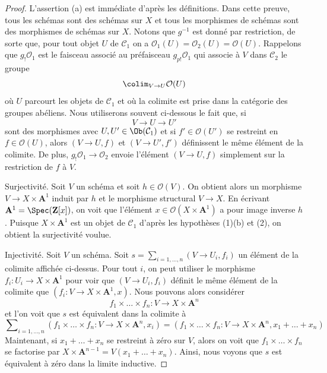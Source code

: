 \begin{proof}
L'assertion (a) est imm\'ediate d'apr\`es les d\'efinitions.
Dans cette preuve, tous les sch\'emas sont des sch\'emas sur $X$ et tous les morphismes de
sch\'emas sont des morphismes de sch\'emas sur $X$. Notons que $g^{-1}$ est
donn\'e par restriction, de sorte que, pour tout objet $U$ de $\mathcal{C}_1$
on a $\mathcal{O}_1(U) = \mathcal{O}_2(U) = \mathcal{O}(U)$.
Rappelons que $g_!\mathcal{O}_1$ est le faisceau associ\'e au pr\'efaisceau
$g_{p!}\mathcal{O}_1$ qui associe \`a $V$ dans $\mathcal{C}_2$ le groupe
$$
\colim_{V \to U} \mathcal{O}(U)
$$
o\`u $U$ parcourt les objets de $\mathcal{C}_1$ et o\`u la colimite est
prise dans la cat\'egorie des groupes ab\'eliens. Nous utiliserons souvent ci-dessous
le fait que, si
$$
V \to U \to U'
$$
sont des morphismes avec $U, U' \in \Ob(\mathcal{C}_1)$
et si $f' \in \mathcal{O}(U')$ se restreint en $f \in \mathcal{O}(U)$,
alors $(V \to U, f)$ et $(V \to U', f')$ d\'efinissent le m\^eme \'el\'ement de la
colimite. De plus, $g_!\mathcal{O}_1 \to \mathcal{O}_2$ envoie l'\'el\'ement
$(V \to U, f)$ simplement sur la restriction de $f$ \`a $V$.

\medskip\noindent
Surjectivit\'e. Soit $V$ un sch\'ema et soit $h \in \mathcal{O}(V)$.
On obtient alors un morphisme $V \to X \times \mathbf{A}^1$ induit par $h$
et le morphisme structural $V \to X$. En \'ecrivant
$\mathbf{A}^1 = \Spec(\mathbf{Z}[x])$, on voit que l'\'el\'ement
$x \in \mathcal{O}(X \times \mathbf{A}^1)$ a pour image inverse
$h$. Puisque $X \times \mathbf{A}^1$ est un objet de $\mathcal{C}_1$
d'apr\`es les hypoth\`eses (1)(b) et (2), on obtient la surjectivit\'e voulue.

\medskip\noindent
Injectivit\'e. Soit $V$ un sch\'ema. Soit
$s = \sum_{i = 1, \ldots, n} (V \to U_i, f_i)$ un \'el\'ement de la colimite
affich\'ee ci-dessus. Pour tout $i$, on peut utiliser le morphisme
$f_i : U_i \to X \times \mathbf{A}^1$
pour voir que $(V \to U_i, f_i)$ d\'efinit le m\^eme \'el\'ement de la colimite que
$(f_i : V \to X \times \mathbf{A}^1, x)$. Nous pouvons alors consid\'erer
$$
f_1 \times \ldots \times f_n : V \to X \times \mathbf{A}^n
$$
et l'on voit que $s$ est \'equivalent dans la colimite \`a
$$
\sum\nolimits_{i = 1, \ldots, n}
(f_1 \times \ldots \times f_n : V \to X \times \mathbf{A}^n, x_i) =
(f_1 \times \ldots \times f_n : V \to X \times \mathbf{A}^n,
x_1 + \ldots + x_n)
$$
Maintenant, si $x_1 + \ldots + x_n$ se restreint \`a z\'ero sur $V$, alors on voit
que $f_1 \times \ldots \times f_n$ se factorise par
$X \times \mathbf{A}^{n - 1} = V(x_1 + \ldots + x_n)$. Ainsi, nous voyons
que $s$ est \'equivalent \`a z\'ero dans la limite inductive.
\end{proof}











